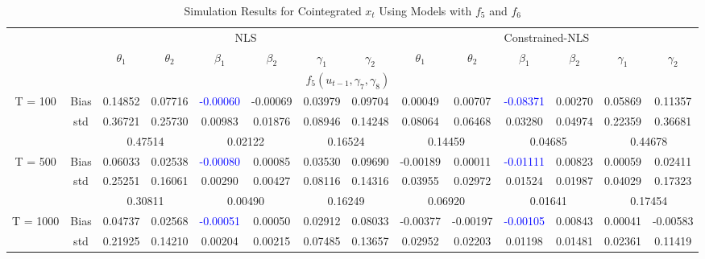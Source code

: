 \documentclass[a4paper,12pt,times,numbered,print,index]{report}
\numberwithin{equation}{section}
\begin{document}
\begin{table}[htbp]
  \centering
  \caption{Simulation Results for Cointegrated $x_t$ Using Models with $f_5$ and $f_6$}
    \begin{adjustbox}{max width=\textwidth}
    \begin{tabular}{cccccccccccccc}
    \toprule
          &       & \multicolumn{6}{c}{NLS}                       & \multicolumn{6}{c}{Constrained-NLS} \\
          &       & $\theta_1$ & $\theta_2$ & $\beta_1$ & $\beta_2$ & $\gamma_1$ & $\gamma_2$ & $\theta_1$ & $\theta_2$ & $\beta_1$ & $\beta_2$ & $\gamma_1$ & $\gamma_2$ \\
    \midrule
    &       & \multicolumn{10}{c}{$f_5 (u_{t-1},\gamma_7, \gamma_8)$}                \\
    \midrule
    \multirow{3}[1]{*}{T = 100} & Bias  & 0.14852 & 0.07716 & \textcolor{blue}{-0.00060} & -0.00069 & 0.03979 & 0.09704 & 0.00049 & 0.00707 & \textcolor{blue}{-0.08371} & 0.00270 & 0.05869 & 0.11357 \\
    & std   & 0.36721 & 0.25730 & 0.00983 & 0.01876 & 0.08946 & 0.14248 & 0.08064 & 0.06468 & 0.03280 & 0.04974 & 0.22359 & 0.36681 \\
    &       & \multicolumn{2}{c}{0.47514} & \multicolumn{2}{c}{0.02122} & \multicolumn{2}{c}{0.16524} & \multicolumn{2}{c}{0.14459} & \multicolumn{2}{c}{0.04685} & \multicolumn{2}{c}{0.44678} \\
    \multirow{3}[0]{*}{T = 500} & Bias  & 0.06033 & 0.02538 & \textcolor{blue}{-0.00080} & 0.00085 & 0.03530 & 0.09690 & -0.00189 & 0.00011 & \textcolor{blue}{-0.01111} & 0.00823 & 0.00059 & 0.02411 \\
    & std   & 0.25251 & 0.16061 & 0.00290 & 0.00427 & 0.08116 & 0.14316 & 0.03955 & 0.02972 & 0.01524 & 0.01987 & 0.04029 & 0.17323 \\
    &       & \multicolumn{2}{c}{0.30811} & \multicolumn{2}{c}{0.00490} & \multicolumn{2}{c}{0.16249} & \multicolumn{2}{c}{0.06920} & \multicolumn{2}{c}{0.01641} & \multicolumn{2}{c}{0.17454} \\
    \multirow{3}[1]{*}{T = 1000} & Bias  & 0.04737 & 0.02568 & \textcolor{blue}{-0.00051} & 0.00050 & 0.02912 & 0.08033 & -0.00377 & -0.00197 & \textcolor{blue}{-0.00105} & 0.00843 & 0.00041 & -0.00583 \\
          & std   & 0.21925 & 0.14210 & 0.00204 & 0.00215 & 0.07485 & 0.13657 & 0.02952 & 0.02203 & 0.01198 & 0.01481 & 0.02361 & 0.11419 \\

\end{tabular}
\end{adjustbox}
\end{table}
\end{document}
